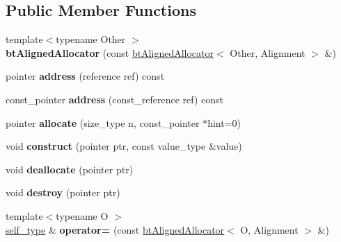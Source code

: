 \subsection*{Public Member Functions}
\begin{DoxyCompactItemize}
\item 
\hypertarget{classbt_aligned_allocator_a8b129ab9ee2c6b8f638714913f5ac7a6}{{\footnotesize template$<$typename Other $>$ }\\{\bfseries bt\+Aligned\+Allocator} (const \hyperlink{classbt_aligned_allocator}{bt\+Aligned\+Allocator}$<$ Other, Alignment $>$ \&)}\label{classbt_aligned_allocator_a8b129ab9ee2c6b8f638714913f5ac7a6}

\item 
\hypertarget{classbt_aligned_allocator_adcead335266c1a9b6ab7a881cdfb2123}{pointer {\bfseries address} (reference ref) const }\label{classbt_aligned_allocator_adcead335266c1a9b6ab7a881cdfb2123}

\item 
\hypertarget{classbt_aligned_allocator_aa43b8d203b56c23838c7468496564f5d}{const\+\_\+pointer {\bfseries address} (const\+\_\+reference ref) const }\label{classbt_aligned_allocator_aa43b8d203b56c23838c7468496564f5d}

\item 
\hypertarget{classbt_aligned_allocator_a5b14474126ff00cd364dfb74304ec6c3}{pointer {\bfseries allocate} (size\+\_\+type n, const\+\_\+pointer $\ast$hint=0)}\label{classbt_aligned_allocator_a5b14474126ff00cd364dfb74304ec6c3}

\item 
\hypertarget{classbt_aligned_allocator_afdb40058534d13fed3fddade2939bd8e}{void {\bfseries construct} (pointer ptr, const value\+\_\+type \&value)}\label{classbt_aligned_allocator_afdb40058534d13fed3fddade2939bd8e}

\item 
\hypertarget{classbt_aligned_allocator_a9aa2ce10c6b68eb249116f8712008724}{void {\bfseries deallocate} (pointer ptr)}\label{classbt_aligned_allocator_a9aa2ce10c6b68eb249116f8712008724}

\item 
\hypertarget{classbt_aligned_allocator_a8570a358258bc64869f0effd8405b69b}{void {\bfseries destroy} (pointer ptr)}\label{classbt_aligned_allocator_a8570a358258bc64869f0effd8405b69b}

\item 
\hypertarget{classbt_aligned_allocator_a5366e980346aa0b85befd8ffecdffb9d}{{\footnotesize template$<$typename O $>$ }\\\hyperlink{classbt_aligned_allocator}{self\+\_\+type} \& {\bfseries operator=} (const \hyperlink{classbt_aligned_allocator}{bt\+Aligned\+Allocator}$<$ O, Alignment $>$ \&)}\label{classbt_aligned_allocator_a5366e980346aa0b85befd8ffecdffb9d}

\end{DoxyCompactItemize}
